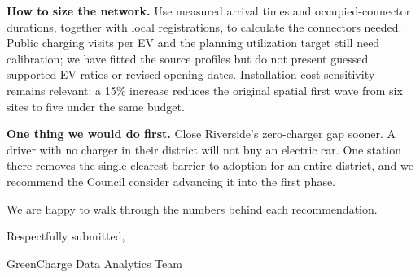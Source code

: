 \documentclass[12pt]{article}
\begin{document}
\textbf{How to size the network.} Use measured arrival times and occupied-connector
durations, together with local registrations, to calculate the connectors needed.
Public charging visits per EV and the planning utilization target still need calibration;
we have fitted the source profiles but do not present guessed supported-EV ratios or
revised opening dates. Installation-cost sensitivity remains relevant: a 15\% increase
reduces the original spatial first wave from six sites to five under the same budget.

\textbf{One thing we would do first.} Close Riverside's zero-charger gap sooner. A driver
with no charger in their district will not buy an electric car. One station there removes
the single clearest barrier to adoption for an entire district, and we recommend the
Council consider advancing it into the first phase.

We are happy to walk through the numbers behind each recommendation.

\vspace{6pt}

Respectfully submitted,

GreenCharge Data Analytics Team

\newpage
\end{document}
